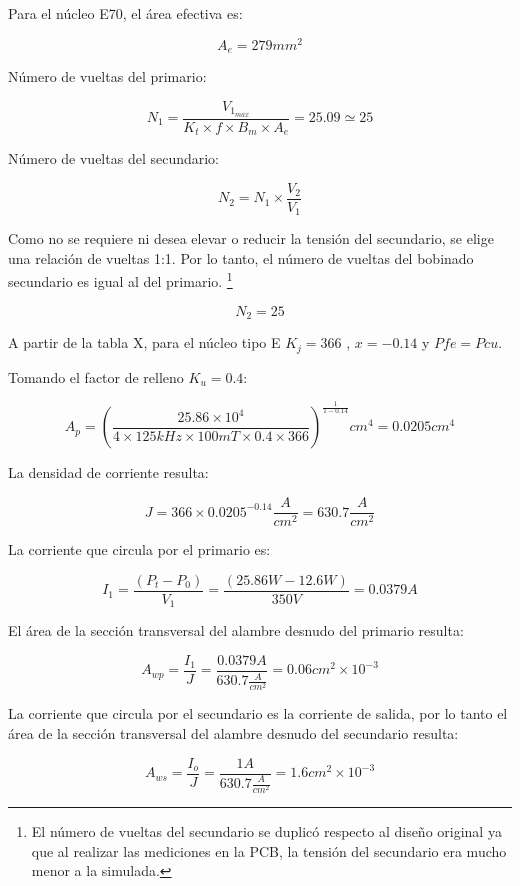 Para el núcleo E70, el área efectiva es: 

$$ A_{e}=279{mm}^{2} $$

Número de vueltas del primario:

$$ N_{1}=\frac{V_{1_{max}}}{K_{t}\times f\times B_{m}\times A_{e}}=25.09\simeq 25 $$

Número de vueltas del secundario: 

$$ N_{2}=N_{1}\times\frac{V_{2}}{V_{1}} $$

Como no se requiere ni desea elevar o reducir la tensión del secundario, se elige una relación de vueltas 1:1. 
Por lo tanto, el número de vueltas del bobinado secundario es igual al del primario. \footnote{El número de vueltas del secundario se duplicó respecto al diseño original ya que al realizar las mediciones en la PCB, la tensión del secundario era mucho menor a la simulada.}

$$ N_{2}=25 $$

A partir de la tabla X, para el núcleo tipo E $ K_{j}=366$ , $x=-0.14$ y $Pfe=Pcu$. 

Tomando el factor de relleno $K_u=0.4$:

$$ A_{p}=\left(\frac{25.86\times 10^{4}}{4\times 125kHz\times 100mT\times 0.4\times 366}\right)^{\frac{1}{1-0.14}} {cm}^4=0.0205 {cm}^4$$

La densidad de corriente resulta:

$$ J=366\times 0.0205^{-0.14} \frac{A}{cm^2}=630.7 \frac{A}{cm^2} $$

La corriente que circula por el primario es:

$$ I_1=\frac{(P_t-P_0)}{V_1}=\frac{(25.86W-12.6W)}{350V}=0.0379A $$

El área de la sección transversal del alambre desnudo del primario resulta:

$$ A_{wp}=\frac{I_1}{J}=\frac{0.0379A}{630.7 \frac{A}{cm^2}}=0.06cm^2 \times10^{-3} $$

La corriente que circula por el secundario es la corriente de salida, 
por lo tanto el área de la sección transversal del alambre desnudo del secundario resulta:

$$ A_{ws}=\frac{I_o}{J}=\frac{1A}{630.7 \frac{A}{cm^2}}=1.6cm^2\times10^{-3} $$

